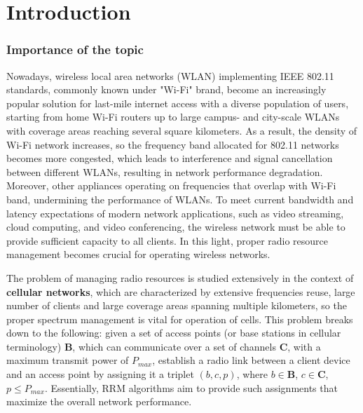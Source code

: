 \chapter{Introduction}
\label{chap:intro}
\chaptermark{}

\subsection{Importance of the topic}
Nowadays, wireless local area networks (WLAN) implementing IEEE 802.11 standards, commonly known under "Wi-Fi" brand, become an increasingly popular solution for last-mile internet access with a diverse population of users, starting from home Wi-Fi routers up to large campus- and city-scale WLANs with coverage areas reaching several square kilometers.
As a result, the density of Wi-Fi network increases, so the frequency band allocated for 802.11 networks becomes more congested, which leads to interference and signal cancellation between different WLANs, resulting in network performance degradation.
Moreover, other appliances operating on frequencies that overlap with Wi-Fi band, undermining the performance of WLANs.
To meet current bandwidth and latency expectations of modern network applications, such as video streaming, cloud computing, and video conferencing, the wireless network must be able to provide sufficient capacity to all clients. In this light, proper radio resource management becomes crucial for operating wireless networks.

The problem of managing radio resources is studied extensively in the context of \textbf{cellular networks}, which are characterized by extensive frequencies reuse, large number of clients and large coverage areas spanning multiple kilometers, so the proper spectrum management is vital for operation of cells. This problem breaks down to the following: given a set of access points (or base stations in cellular terminology) $\boldsymbol{B}$, which can communicate over a set of channels $\boldsymbol{C}$, with a maximum transmit power of $P_{max}$, establish a radio link between a client device and an access point by assigning it a triplet $(b, c, p)$, where $b \in \boldsymbol{B}$, $c \in \boldsymbol{C}$, $p \leq P_{max}$.
Essentially, RRM algorithms aim to provide such assignments that maximize the overall network performance.
